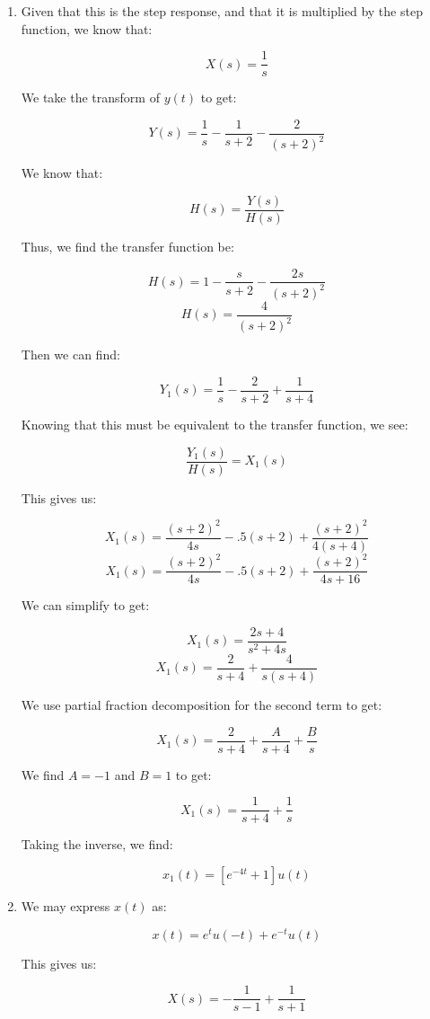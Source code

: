 \begin{enumerate}
\begin{enumerate}
\begin{enumerate}
        \end{enumerate}

    \end{enumerate}

  \item Given that this is the step response, and that it is multiplied by the step function, we know that:

    $$X(s)=\frac{1}{s}$$

    We take the transform of $y(t)$ to get:

    $$Y(s)=\frac{1}{s}-\frac{1}{s+2}-\frac{2}{(s+2)^2}$$

    We know that:

    $$H(s)=\frac{Y(s)}{H(s)}$$

    Thus, we find the transfer function be:

    $$H(s)=1-\frac{s}{s+2}-\frac{2s}{(s+2)^2}$$
    $$H(s)=\frac{4}{(s+2)^2}$$

    Then we can find:

    $$Y_1(s)=\frac{1}{s}-\frac{2}{s+2}+\frac{1}{s+4}$$

    Knowing that this must be equivalent to the transfer function, we see:

    $$\frac{Y_1(s)}{H(s)}=X_1(s)$$

    This gives us:

    $$X_1(s)=\frac{(s+2)^2}{4s}-.5(s+2)+\frac{(s+2)^2}{4(s+4)}$$
    $$X_1(s)=\frac{(s+2)^2}{4s}-.5(s+2)+\frac{(s+2)^2}{4s+16}$$

    We can simplify to get:

    $$X_1(s)=\frac{2s+4}{s^2+4s}$$
    $$X_1(s)=\frac{2}{s+4}+\frac{4}{s(s+4)}$$

    We use partial fraction decomposition for the second term to get:

    $$X_1(s)=\frac{2}{s+4}+\frac{A}{s+4}+\frac{B}{s}$$

    We find $A=-1$ and $B=1$ to get:

    $$X_1(s)=\frac{1}{s+4}+\frac{1}{s}$$

    Taking the inverse, we find:

    $$\boxed{x_1(t)=[e^{-4t}+1]u(t)}$$

  \item

    We may express $x(t)$ as:

    $$x(t)=e^{t}u(-t)+e^{-t}u(t)$$

    This gives us:

    $$X(s)=-\frac{1}{s-1}+\frac{1}{s+1}$$


\end{enumerate}
